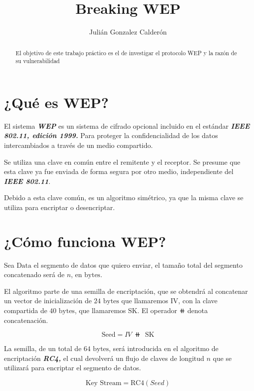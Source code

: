 \documentclass[
]{article}
\title{Breaking WEP}
\author{Julián Gonzalez Calderón}
\date{}
\begin{document}
\maketitle
\begin{abstract}
El objetivo de este trabajo práctico es el de investigar el protocolo
WEP y la razón de su vulnerabilidad
\end{abstract}

\newpage

\hypertarget{quuxe9-es-wep}{%
\section{¿Qué es WEP?}\label{quuxe9-es-wep}}

El sistema \textbf{\emph{WEP}} es un sistema de cifrado opcional
incluido en el estándar \textbf{\emph{IEEE 802.11, edición 1999.}} Para
proteger la confidencialidad de los datos intercambiados a través de un
medio compartido.

Se utiliza una clave en común entre el remitente y el receptor. Se
presume que esta clave ya fue enviada de forma segura por otro medio,
independiente del \textbf{\emph{IEEE 802.11}}.

Debido a esta clave común, es un algoritmo simétrico, ya que la misma
clave se utiliza para encriptar o desencriptar.

\hypertarget{cuxf3mo-funciona-wep}{%
\section{¿Cómo funciona WEP?}\label{cuxf3mo-funciona-wep}}

Sea \(\text{Data}\) el segmento de datos que quiero enviar, el tamaño
total del segmento concatenado será de \(n\), en \(\text{bytes}\).

El algoritmo parte de una semilla de encriptación, que se obtendrá al
concatenar un vector de inicialización de \(24 \text{ bytes}\) que
llamaremos \(\text{IV}\), con la clave compartida de
\(40 \text{ bytes}\), que llamaremos \(\text{SK}\). El operador
\(\doubleplus\) denota concatenación.

\[
\text{Seed} = IV \ ⧺\ \  \text{SK}
\]

La semilla, de un total de \(64 \text{ bytes}\), será introducida en el
algoritmo de encriptación \textbf{\emph{RC4,}} el cual devolverá un
flujo de claves de longitud \(n\) que se utilizará para encriptar el
segmento de datos.

\[
\text{Key Stream} = \text{RC4}(Seed)
\]
\end{document}
